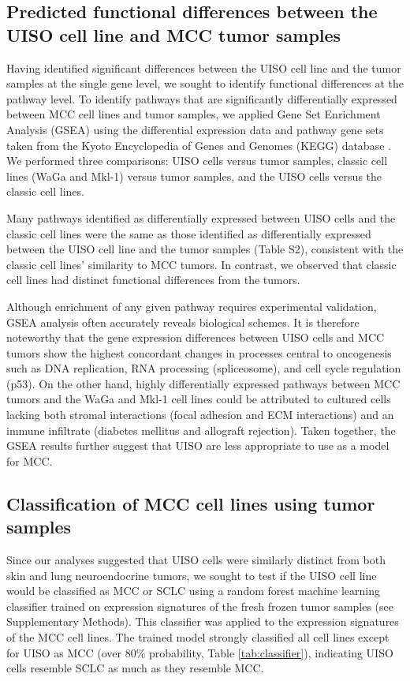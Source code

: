 \documentclass[10pt]{article}
\begin{document}
\subsection*{Predicted functional differences between the UISO cell line and MCC tumor samples}
Having identified significant differences between the UISO cell line and the tumor samples at the single gene level, we sought to identify functional differences at the pathway level.
To identify pathways that are significantly differentially expressed between MCC cell lines and tumor samples, we applied Gene Set Enrichment Analysis (GSEA) \citep{Subramanian2005Gene} using the differential expression data and pathway gene sets taken from the Kyoto Encyclopedia of Genes and Genomes (KEGG) database \citep{Kanehisa2000KEGG}.
We performed three comparisons: UISO cells versus tumor samples, classic cell lines (WaGa and Mkl-1) versus tumor samples, and the UISO cells versus the classic cell lines.

Many pathways identified as differentially expressed between UISO cells and the classic cell lines were the same as those identified as differentially expressed between the UISO cell line and the tumor samples (Table S2), consistent with the classic cell lines' similarity to MCC tumors.
In contrast, we observed that classic cell lines had distinct functional differences from the tumors.

Although enrichment of any given pathway requires experimental validation, GSEA analysis often accurately reveals biological schemes.
It is therefore noteworthy that the gene expression differences between UISO cells and MCC tumors show the highest concordant changes in processes central to oncogenesis such as DNA replication, RNA processing (spliceosome), and cell cycle regulation (p53).
On the other hand, highly differentially expressed pathways between MCC tumors and the WaGa and Mkl-1 cell lines could be attributed to cultured cells lacking both stromal interactions (focal adhesion and ECM interactions) and an immune infiltrate (diabetes mellitus and allograft rejection).
Taken together, the GSEA results further suggest that UISO are less appropriate to use as a model for MCC.

\subsection*{Classification of MCC cell lines using tumor samples}
Since our analyses suggested that UISO cells were similarly distinct from both skin and lung neuroendocrine tumors, we sought to test if the UISO cell line would be classified as MCC or SCLC using a random forest machine learning classifier trained on expression signatures of the fresh frozen tumor samples (see Supplementary Methods).
This classifier was applied to the expression signatures of the MCC cell lines.
The trained model strongly classified all cell lines except for UISO as MCC (over 80\% probability, Table \ref{tab:classifier}), indicating UISO cells resemble SCLC as much as they resemble MCC.
\end{document}
